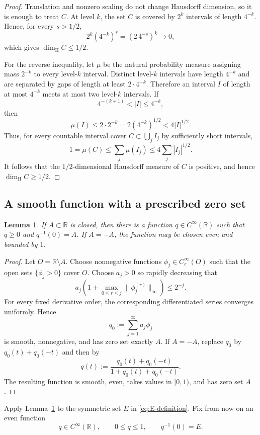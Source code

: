 \documentclass[11pt]{amsart}
\newtheorem{lemma}[theorem]{Lemma}
\theoremstyle{remark}
\newcommand{\R}{\mathbb R}
\newcommand{\Hd}{\dim_{\mathrm H}}
\begin{document}
\begin{proof}
Translation and nonzero scaling do not change Hausdorff dimension, so it is enough to treat $C$.  At level $k$, the set $C$ is covered by $2^k$ intervals of length $4^{-k}$.  Hence, for every $s>1/2$,
\[
 2^k(4^{-k})^s=(2\,4^{-s})^k\longrightarrow0,
\]
which gives $\Hd C\leq1/2$.

For the reverse inequality, let $\mu$ be the natural probability measure assigning mass $2^{-k}$ to every level-$k$ interval.  Distinct level-$k$ intervals have length $4^{-k}$ and are separated by gaps of length at least $2\cdot4^{-k}$.  Therefore an interval $I$ of length at most $4^{-k}$ meets at most two level-$k$ intervals.  If
\[
 4^{-(k+1)}<|I|\leq4^{-k},
\]
then
\[
 \mu(I)\leq2\cdot2^{-k}
 =2(4^{-k})^{1/2}
 <4|I|^{1/2}.
\]
Thus, for every countable interval cover $C\subset\bigcup_j I_j$ by sufficiently short intervals,
\[
 1=\mu(C)\leq\sum_j\mu(I_j)
 \leq4\sum_j |I_j|^{1/2}.
\]
It follows that the $1/2$-dimensional Hausdorff measure of $C$ is positive, and hence $\Hd C\geq1/2$.
\end{proof}

\subsection{A smooth function with a prescribed zero set}

\begin{lemma}\label{lem:smooth-zero-set}
If $A\subset\R$ is closed, then there is a function $q\in C^\infty(\R)$ such that $q\geq0$ and $q^{-1}(0)=A$.  If $A=-A$, the function may be chosen even and bounded by $1$.
\end{lemma}

\begin{proof}
Let $O=\R\setminus A$.  Choose nonnegative functions
$\phi_j\in C_c^\infty(O)$ such that the open sets $\{\phi_j>0\}$ cover $O$.  Choose $a_j>0$ so rapidly decreasing that
\[
 a_j\left(1+\max_{0\leq r\leq j}\|\phi_j^{(r)}\|_\infty\right)\leq2^{-j}.
\]
For every fixed derivative order, the corresponding differentiated series converges uniformly.  Hence
\[
 q_0:=\sum_{j=1}^\infty a_j\phi_j
\]
is smooth, nonnegative, and has zero set exactly $A$.  If $A=-A$, replace $q_0$ by $q_0(t)+q_0(-t)$ and then by
\[
 q(t):=\frac{q_0(t)+q_0(-t)}{1+q_0(t)+q_0(-t)}.
\]
The resulting function is smooth, even, takes values in $[0,1)$, and has zero set $A$.
\end{proof}

Apply Lemma~\ref{lem:smooth-zero-set} to the symmetric set $E$ in \eqref{eq:E-definition}.  Fix from now on an even function
\begin{equation}\label{eq:q-properties}
 q\in C^\infty(\R),\qquad 0\leq q\leq1,
 \qquad q^{-1}(0)=E.
\end{equation}
\end{document}
